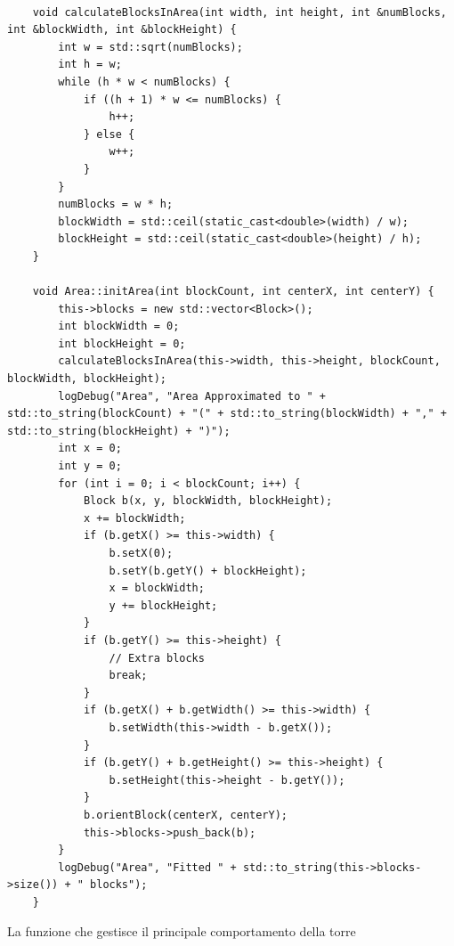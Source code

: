 \documentclass[a4paper, 11pt]{article}
\begin{document}
    \begin{lstlisting}[style=customcpp, caption={da area.cpp}]

    void calculateBlocksInArea(int width, int height, int &numBlocks, int &blockWidth, int &blockHeight) {
        int w = std::sqrt(numBlocks);
        int h = w;
        while (h * w < numBlocks) {
            if ((h + 1) * w <= numBlocks) {
                h++;
            } else {
                w++;
            }
        }
        numBlocks = w * h;
        blockWidth = std::ceil(static_cast<double>(width) / w);
        blockHeight = std::ceil(static_cast<double>(height) / h);
    }

    void Area::initArea(int blockCount, int centerX, int centerY) {
        this->blocks = new std::vector<Block>();
        int blockWidth = 0;
        int blockHeight = 0;
        calculateBlocksInArea(this->width, this->height, blockCount, blockWidth, blockHeight);
        logDebug("Area", "Area Approximated to " + std::to_string(blockCount) + "(" + std::to_string(blockWidth) + "," + std::to_string(blockHeight) + ")");
        int x = 0;
        int y = 0;
        for (int i = 0; i < blockCount; i++) {
            Block b(x, y, blockWidth, blockHeight);
            x += blockWidth;
            if (b.getX() >= this->width) {
                b.setX(0);
                b.setY(b.getY() + blockHeight);
                x = blockWidth;
                y += blockHeight;
            }
            if (b.getY() >= this->height) {
                // Extra blocks
                break;
            }
            if (b.getX() + b.getWidth() >= this->width) {
                b.setWidth(this->width - b.getX());
            }
            if (b.getY() + b.getHeight() >= this->height) {
                b.setHeight(this->height - b.getY());
            }
            b.orientBlock(centerX, centerY);
            this->blocks->push_back(b);
        }
        logDebug("Area", "Fitted " + std::to_string(this->blocks->size()) + " blocks");
    }
\end{lstlisting}
\newpage
La funzione che gestisce il principale comportamento della torre
\end{document}
